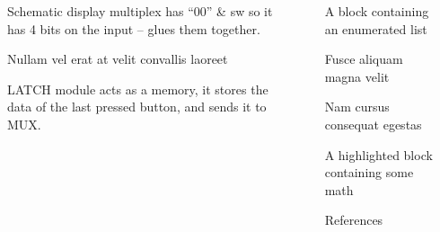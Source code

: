 \documentclass[final]{beamer}
\newlength{\sepwidth}
\newlength{\colwidth}
\newcommand{\separatorcolumn}{\begin{column}{\sepwidth}\end{column}}
\begin{document}
\begin{frame}[t]
\begin{columns}[t]
\begin{column}{\colwidth}
\begin{alertblock}{Schematic}
      display multiplex has ``00'' \& sw so it has 4 bits on the input -- glues them together.

  \end{alertblock}

 \begin{block}{Nullam vel erat at velit convallis laoreet}

  LATCH module acts as a memory, it stores the data of the last pressed button, and sends it to MUX.

  \end{block}

\end{column}

\separatorcolumn

\begin{column}{\colwidth}

  \begin{block}{A block containing an enumerated list}
  \end{block}

  \begin{block}{Fusce aliquam magna velit}

  \end{block}

  \begin{block}{Nam cursus consequat egestas}

  \end{block}
  
  \begin{exampleblock}{A highlighted block containing some math}

  \end{exampleblock}

  \begin{block}{References}

    \nocite{*}
    \footnotesize{}

  \end{block}

\end{column}
\separatorcolumn

\end{columns}
\end{frame}
\end{document}
